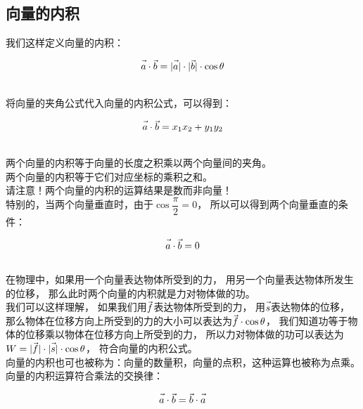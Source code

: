 \documentclass[UTF8]{ctexart}
\let\nvec\vec
\def\vec#1{\nvec{\vphantom b\smash{#1}}}
\begin{document}
\subsection{向量的内积}
    我们这样定义向量的内积：
    \begin{large}
    \begin{equation*}
        \vec{a}\cdot\vec{b}=|\vec{a}|\cdot|\vec{b}|\cdot\cos{\theta}
    \end{equation*}
    \end{large}\\
    将向量的夹角公式代入向量的内积公式，可以得到：
    \begin{large}
    \begin{equation*}
        \vec{a}\cdot\vec{b}=x_1x_2+y_1y_2
    \end{equation*}
    \end{large}\\
    两个向量的内积等于向量的长度之积乘以两个向量间的夹角。\\[2mm]
    两个向量的内积等于它们对应坐标的乘积之和。\\[2mm]
    请注意！两个向量的内积的运算结果是数而非向量！\\[6mm]
    特别的，当两个向量垂直时，由于$\cos{\dfrac{\pi}{2}}=0$，
    所以可以得到两个向量垂直的条件：
    \begin{large}
    \begin{equation*}
        \vec{a}\cdot\vec{b}=0
    \end{equation*}
    \end{large}\\
    在物理中，如果用一个向量表达物体所受到的力，
    用另一个向量表达物体所发生的位移，
    那么此时两个向量的内积就是力对物体做的功。\\[3mm]
    我们可以这样理解，
    如果我们用$\vec{f}$表达物体所受到的力，
    用$\vec{s}$表达物体的位移，
    那么物体在位移方向上所受到的力的大小可以表达为$\vec{f}\cdot\cos{\theta}$，
    我们知道功等于物体的位移乘以物体在位移方向上所受到的力，
    所以力对物体做的功可以表达为$W=|\vec{f}|\cdot|\vec{s}|\cdot\cos{\theta}$，
    符合向量的内积公式。\\[3mm]
    向量的内积也可也被称为：向量的数量积，向量的点积，这种运算也被称为点乘。\\[6mm]
    向量的内积运算符合乘法的交换律：
    \begin{large}
    \begin{equation*}
        \vec{a}\cdot\vec{b}=\vec{b}\cdot\vec{a}
    \end{equation*}
    \end{large}\\
\end{document}
